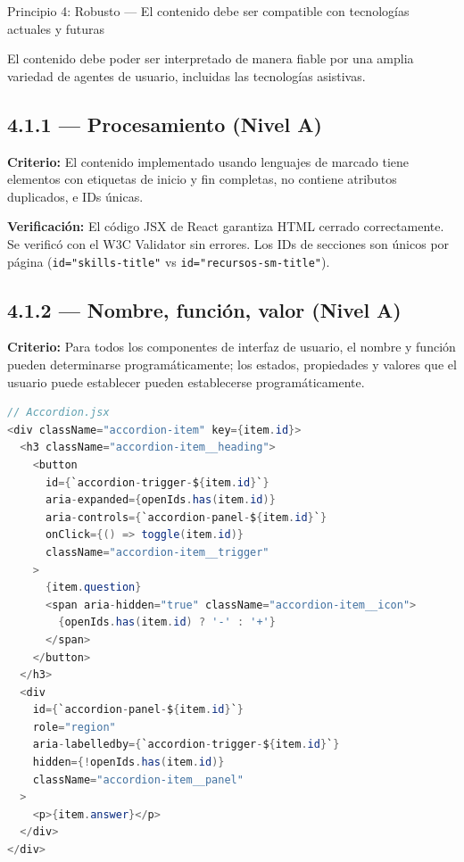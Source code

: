 \documentclass[12pt, a4paper]{article}
\begin{document}
\begin{princbox}[errored]{Principio 4: Robusto --- El contenido debe ser compatible con tecnologías actuales y futuras}

El contenido debe poder ser interpretado de manera fiable por una amplia variedad de agentes de usuario, incluidas las tecnologías asistivas.
\end{princbox}

\subsection{4.1.1 --- Procesamiento (Nivel A)}

\textbf{Criterio:} El contenido implementado usando lenguajes de marcado tiene elementos con etiquetas de inicio y fin completas, no contiene atributos duplicados, e IDs únicas.

\textbf{Verificación:} El código JSX de React garantiza HTML cerrado correctamente. Se verificó con el W3C Validator sin errores. Los IDs de secciones son únicos por página (\texttt{id="skills-title"} vs \texttt{id="recursos-sm-title"}).

\subsection{4.1.2 --- Nombre, función, valor (Nivel A)}

\textbf{Criterio:} Para todos los componentes de interfaz de usuario, el nombre y función pueden determinarse programáticamente; los estados, propiedades y valores que el usuario puede establecer pueden establecerse programáticamente.

\begin{evidbox}
\begin{lstlisting}[language=Java]
// Accordion.jsx
<div className="accordion-item" key={item.id}>
  <h3 className="accordion-item__heading">
    <button
      id={`accordion-trigger-${item.id}`}
      aria-expanded={openIds.has(item.id)}
      aria-controls={`accordion-panel-${item.id}`}
      onClick={() => toggle(item.id)}
      className="accordion-item__trigger"
    >
      {item.question}
      <span aria-hidden="true" className="accordion-item__icon">
        {openIds.has(item.id) ? '-' : '+'}
      </span>
    </button>
  </h3>
  <div
    id={`accordion-panel-${item.id}`}
    role="region"
    aria-labelledby={`accordion-trigger-${item.id}`}
    hidden={!openIds.has(item.id)}
    className="accordion-item__panel"
  >
    <p>{item.answer}</p>
  </div>
</div>
\end{lstlisting}
\end{evidbox}
\end{document}
